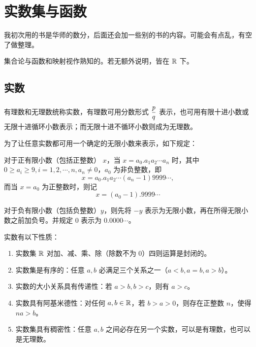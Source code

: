 \chapter{实数集与函数}

我初次用的书是华师的数分，后面还会加一些别的书的内容。可能会有点乱，有空了做整理。

集合论与函数和映射视作熟知的。若无额外说明，皆在 $\mathbb{R}$ 下。

\section{实数}

有理数和无理数统称实数，有理数可用分数形式 $\mfrac{p}{q}$ 表示，也可用有限十进小数或无限十进循环小数表示；而无限十进不循环小数则成为无理数。

为了让任意实数都可用一个确定的无限小数来表示，如下规定：

对于正有限小数（包括正整数） $x$，当 $x=a_0.a_1a_2\cdots{}a_n$ 时，其中 $0\ge a_i \ge 9,i=1,2,\cdots,n,a_n\neq 0$，$a_0$ 为非负整数，即 $$x=a_0.a_1a_2\cdots{}(a_n-1)9999\cdots,$$ 而当 $x=a_0$ 为正整数时，则记 $$x=(a_0-1).9999\cdots$$

对于负有限小数（包括负整数）$y$，则先将 $-y$ 表示为无限小数，再在所得无限小数之前加负号。并规定 $0$ 表示为 $0.0000\cdots$。



实数有以下性质：

\begin{enumerate}
	\item 实数集 $\mathbb{R}$ 对加、减、乘、除（除数不为 $0$）四则运算是封闭的。
	\item 实数集是有序的：任意 $a,b$ 必满足三个关系之一（$a<b,a=b,a>b$）。
	\item 实数的大小关系具有传递性：若 $a>b,b>c$，则有 $a>c$。
	\item 实数具有阿基米德性：对任何 $a,b\in\mathbb{R}$，若 $b>a>0$，则存在正整数 $n$，使得 $na>b$。
	\item 实数集具有稠密性：任意 $a,b$ 之间必存在另一个实数，可以是有理数，也可以是无理数。
\end{enumerate}

